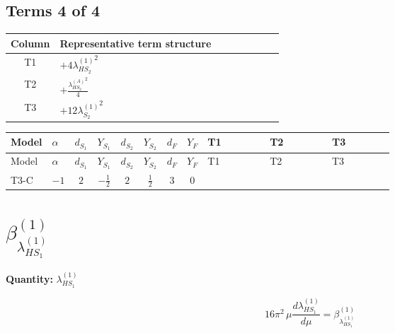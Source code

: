 \documentclass[8pt]{article}
\begin{document}
\begin{landscape}
\subsection*{Terms 4 of 4}
\begin{center}
\begin{tabular}{@{}c >{\raggedright\arraybackslash}p{0.82\linewidth}@{}}
\toprule
Column & Representative term structure \\
\midrule
T1 & \(\displaystyle +4 {\lambda_{HS_2}^{(1)}}^2\) \\
\midrule
T2 & \(\displaystyle +\frac{{\lambda_{HS_2}^{(A)}}^2}{4}\) \\
\midrule
T3 & \(\displaystyle +12 {\lambda_{S_2}^{(1)}}^2\) \\
\midrule
\bottomrule
\end{tabular}
\end{center}
\smallskip
\tiny
\begin{longtable}{@{}llcccccc >{\raggedright\arraybackslash}p{0.21\linewidth} >{\raggedright\arraybackslash}p{0.21\linewidth} >{\raggedright\arraybackslash}p{0.21\linewidth}@{}}
\toprule
Model & $\alpha$ & $d_{S_1}$ & $Y_{S_1}$ & $d_{S_2}$ & $Y_{S_2}$ & $d_F$ & $Y_F$ & T1 & T2 & T3 \\
\midrule
\endfirsthead
\toprule
Model & $\alpha$ & $d_{S_1}$ & $Y_{S_1}$ & $d_{S_2}$ & $Y_{S_2}$ & $d_F$ & $Y_F$ & T1 & T2 & T3 \\
\midrule
\endhead
T3-C & $-1$ & $2$ & $-\frac{1}{2}$ & $2$ & $\frac{1}{2}$ & $3$ & $0$ & \scriptsize\adjustbox{max width=\linewidth}{$\begin{gathered} +4 {\lambda_{HS_2}^{(1)}}^2\end{gathered}$} & \scriptsize\adjustbox{max width=\linewidth}{$\begin{gathered} +\frac{{\lambda_{HS_2}^{(A)}}^2}{4}\end{gathered}$} & \scriptsize\adjustbox{max width=\linewidth}{$\begin{gathered} +12 {\lambda_{S_2}^{(1)}}^2\end{gathered}$} \\
\midrule
\bottomrule
\end{longtable}
\clearpage
\section*{$\beta_{\lambda_{HS_1}^{(1)}}^{(1)}$}
\noindent\textbf{Quantity: }$\lambda_{HS_1}^{(1)}$\par\smallskip
\[16\pi^2\,\mu\frac{d \lambda_{HS_1}^{(1)}}{d\mu}=\beta_{\lambda_{HS_1}^{(1)}}^{(1)}\]

\end{landscape}
\end{document}

